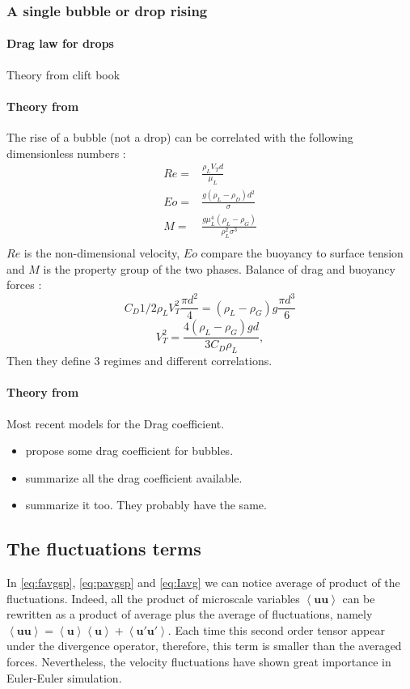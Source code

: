 \subsubsection{A single bubble or drop rising}
\paragraph*{Drag law for drops}
Theory from clift book
\paragraph*{Theory from \citet{tomiyama1998drag}}
The rise of a bubble (not a drop) can be correlated with the following dimensionless numbers :
\begin{align}
    Re = & \frac{\rho_L V_T d}{\mu_L}\\
    Eo = & \frac{g(\rho_L-\rho_D) d^2}{\sigma}\\
    M = & \frac{g\mu_L^4(\rho_L-\rho_G)}{\rho_L^2\sigma^3}\\
\end{align}
$Re$ is the non-dimensional velocity, $Eo$ compare the buoyancy to surface tension and $M$ is the property group of the two phases. 
Balance of drag and buoyancy forces :
\begin{equation}
    C_D 1/2 \rho_LV^2_T\frac{\pi d^2}{4}= (\rho_L-\rho_G)g\frac{\pi d^3}{6}
\end{equation}
\begin{equation}
    V^2_T = \frac{4(\rho_L-\rho_G)g d}{3C_D\rho_L},
\end{equation}
Then they define 3 regimes and different correlations. 
\paragraph*{Theory from \citet{loth2008drag}}
Most recent models for the Drag coefficient. 
\begin{itemize}
    \item \cite{tomiyama1998drag} propose some drag coefficient for bubbles. 
    \item \cite{sporleder2012population} summarize all the drag coefficient available.
    \item \citet{gemello2018modelling} summarize it too. They probably have the same. 
\end{itemize}
\subsection{The fluctuations terms}
In \ref{eq:favgsp}, \ref{eq:pavgsp} and \ref{eq:Iavg} we can notice average of product of the fluctuations. 
Indeed, all the product of microscale variables $\left<\bm{uu}\right>$ can be rewritten as a product of average plus the average of fluctuations, namely $\left<\bm{uu}\right> = \left<\bm{u}\right>\left<\bm{u}\right> + \left<\bm{u'u'}\right>$. 
Each time this second order tensor appear under the divergence operator, therefore, this term is smaller than the averaged forces. 
Nevertheless, the velocity fluctuations have shown great importance in Euler-Euler simulation. 
